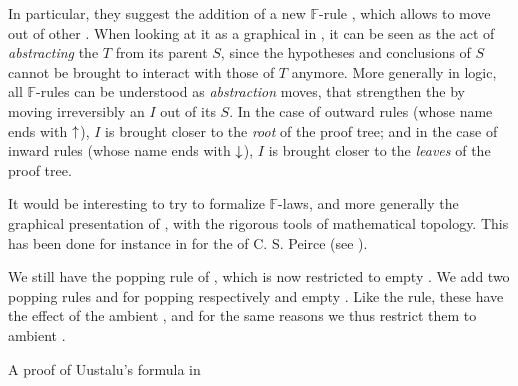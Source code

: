 \begin{description}
  In particular, they suggest the addition of a new $\mathbb{F}$-rule
  , which allows to move   out of other
   . When looking at it as a graphical  in
  , it can be seen as the act of \emph{abstracting} the
   $T$ from its parent  $S$, since the hypotheses and
  conclusions of $S$ cannot be brought to interact with those of $T$ anymore.
  More generally in  logic, all $\mathbb{F}$-rules can be
  understood as \emph{abstraction} moves, that strengthen the  by
  moving irreversibly an  $I$ out of its  $S$. In the case
  of outward rules (whose name ends with $\uparrow$), $I$ is brought closer to the
  \emph{root} of the proof tree; and in the case of inward rules (whose name
  ends with $\downarrow$), $I$ is brought closer to the \emph{leaves} of the proof
  tree.
  
  It would be interesting to try to formalize $\mathbb{F}$-laws, and more
  generally the graphical presentation of , with the rigorous tools
  of mathematical topology. This has been done for instance in
   for the  of C. S.
  Peirce (see ).

  \item[\textbf{\membrane}] 
  We still have the popping rule  of , which is now restricted to
   empty . We add two popping rules  and  for
  popping respectively  and   empty . Like the
   rule, these have the effect of  the ambient
  , and for the same reasons we thus restrict them to  ambient
  .

  \begin{marginfigure}
    
    \caption{A proof of Uustalu's formula in }
  \end{marginfigure}


\end{description}
